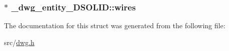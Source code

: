 \hypertarget{struct__dwg__entity__3DSOLID_ac43b98c23719184f6b6bdbe6f34c90d7}{
\subsubsection[{wires}]{$\ast$ {\bf \-\_\-dwg\-\_\-entity\-\_\-D\-S\-O\-L\-I\-D\-::wires}}}\label{struct__dwg__entity__3DSOLID_ac43b98c23719184f6b6bdbe6f34c90d7}


\-The documentation for this struct was generated from the following file\-:\begin{DoxyCompactItemize}
\item 
src/\hyperlink{dwg_8h}{dwg.\-h}\end{DoxyCompactItemize}
